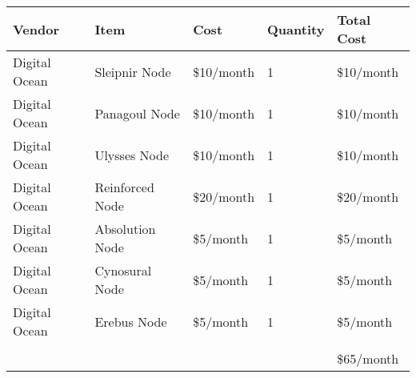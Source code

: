\documentclass[11pt]{article}
\begin{document}
\begin{center}
    \begin{tabular}{ | l | l | l | l | l |}
    \hline
    Vendor & Item & Cost & Quantity & Total Cost\\ \hline
    Digital Ocean & Sleipnir Node & \$10/month & 1 & \$10/month \\ \hline
    Digital Ocean & Panagoul Node & \$10/month & 1 & \$10/month \\ \hline
    Digital Ocean & Ulysses Node & \$10/month & 1 & \$10/month \\ \hline
    Digital Ocean & Reinforced Node & \$20/month & 1 & \$20/month \\ \hline
    Digital Ocean & Absolution Node & \$5/month & 1 & \$5/month \\ \hline
    Digital Ocean & Cynosural Node & \$5/month & 1 & \$5/month \\ \hline
    Digital Ocean & Erebus Node & \$5/month & 1 & \$5/month \\ \hline
    \space & \space & \space & \space & \space \\ \hline
    \space & \space & \space & \space & \$65/month \\ \hline
    \hline
    \end{tabular}
\end{center}
\end{document}
